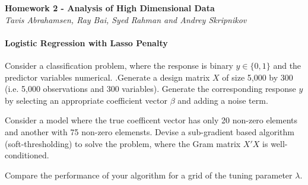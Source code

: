 \documentclass[12pt, leqno]{article}
\begin{document}
\pagestyle{fancy}

\begin{center}
{\large {\bf Homework 2 - Analysis of High Dimensional Data}} \\
{\it{Tavis Abrahamsen, Ray Bai, Syed Rahman and Andrey Skripnikov}} \\
\end{center}

\paragraph{Logistic Regression with Lasso Penalty} Consider a classification problem, where the response is
binary $y \in \{0,1\}$ and the predictor variables numerical. .Generate a design matrix $X$ of size 5,000 by 300 (i.e. 5,000 observations and 300 variables). Generate the corresponding response $y$ by selecting an appropriate coefficient vector $\beta$ and adding a noise term.

Consider a model where the true coefficent vector has only 20 non-zero
elements and another with 75 non-zero elemensts. Devise a sub-gradient
based algorithm (soft-thresholding) to solve the problem, where the Gram matrix $X'X$ is well-conditioned.

Compare the performance of your algorithm for a grid of the tuning parameter $\lambda$.
\end{document}
